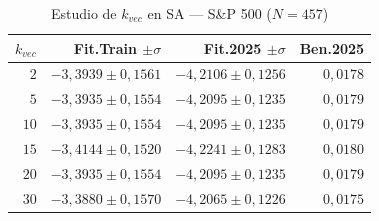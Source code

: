 \documentclass[12pt,a4paper]{article}
\begin{document}
\begin{table}[H]
\centering\footnotesize
\caption{Estudio de $k_{vec}$ en SA --- S\&P 500 ($N=457$)}
\begin{tabular}{rrrr}
\toprule
$k_{vec}$ & \textbf{Fit.Train} $\pm\sigma$ & \textbf{Fit.2025} $\pm\sigma$ & \textbf{Ben.2025} \\
\midrule
$2$  & $-3{,}3939 \pm 0{,}1561$ & $-4{,}2106 \pm 0{,}1256$ & $0{,}0178$ \\
$5$  & $-3{,}3935 \pm 0{,}1554$ & $-4{,}2095 \pm 0{,}1235$ & $0{,}0179$ \\
$10$ & $-3{,}3935 \pm 0{,}1554$ & $-4{,}2095 \pm 0{,}1235$ & $0{,}0179$ \\
$15$ & $-3{,}4144 \pm 0{,}1520$ & $-4{,}2241 \pm 0{,}1283$ & $0{,}0180$ \\
$20$ & $-3{,}3935 \pm 0{,}1554$ & $-4{,}2095 \pm 0{,}1235$ & $0{,}0179$ \\
$30$ & $-3{,}3880 \pm 0{,}1570$ & $-4{,}2065 \pm 0{,}1226$ & $0{,}0175$ \\
\bottomrule
\end{tabular}
\end{table}
\end{document}
